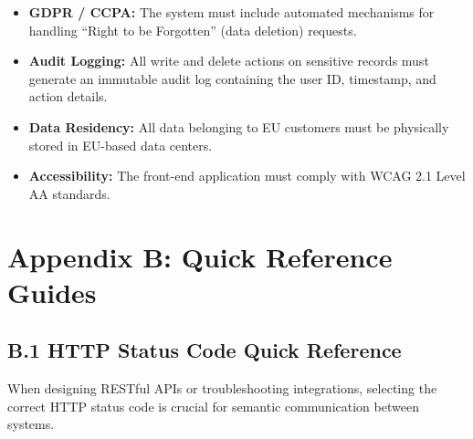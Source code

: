 \begin{itemize}
\tightlist
\item
  \textbf{GDPR / CCPA:} The system must include automated mechanisms for
  handling ``Right to be Forgotten'' (data deletion) requests.
\item
  \textbf{Audit Logging:} All write and delete actions on sensitive
  records must generate an immutable audit log containing the user ID,
  timestamp, and action details.
\item
  \textbf{Data Residency:} All data belonging to EU customers must be
  physically stored in EU-based data centers.
\item
  \textbf{Accessibility:} The front-end application must comply with
  WCAG 2.1 Level AA standards.
\end{itemize}

\bigskip

\section{Appendix B: Quick Reference
Guides}\label{appendix-b-quick-reference-guides}

\subsection{B.1 HTTP Status Code Quick
Reference}\label{b.1-http-status-code-quick-reference}

When designing RESTful APIs or troubleshooting integrations, selecting
the correct HTTP status code is crucial for semantic communication
between systems.

